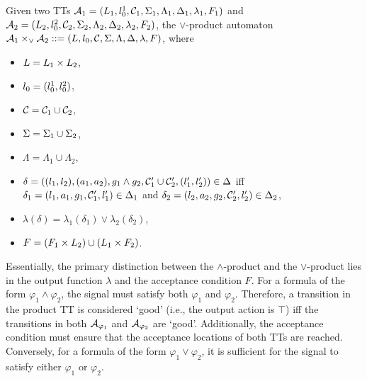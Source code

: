         \begin{definition}
            Given two TTs $\mathcal{A}_1=(L_1,l_0^1,\mathcal{C}_1,\Sigma_1,\Lambda_1,\Delta_1,\allowbreak\lambda_1,F_1)$ and $\mathcal{A}_2=(L_2,l_0^2,\mathcal{C}_2,\Sigma_2,\Lambda_2,\Delta_2,\lambda_2,F_2)$, the $\lor$-product automaton $\mathcal{A}_1\times_{\lor}\mathcal{A}_2\mathrel{::=} (L,l_0,\mathcal{C},\Sigma,\Lambda,\Delta,\lambda,F)$, where
            \begin{itemize}
                \item $L = L_1 \times L_2$,
                \item $l_0 = (l_0^1,l_0^2)$,
                \item $\mathcal{C} = \mathcal{C}_1 \cup \mathcal{C}_2$,
                \item $\Sigma = \Sigma_1 \cup \Sigma_2$,
                \item $\Lambda = \Lambda_1 \cup \Lambda_2$,
                \item $\delta = \left((l_1,l_2),(a_1,a_2),g_1 \land g_2,\mathcal{C}_1'\cup\mathcal{C}_2',(l_1',l_2')\right) \in \Delta$ iff \\ 
                $\delta_1 = (l_1,a_1,g_1,\mathcal{C}_1',l_1')\in \Delta_1$ and $\delta_2 =(l_2,a_2,g_2,\mathcal{C}_2',l_2')\in \Delta_2$,
                \item $\lambda(\delta) = \lambda_1(\delta_1)\lor\lambda_2(\delta_2) $,
                \item $F = (F_1\times L_2)\cup(L_1\times F_2)$.
            \end{itemize}
        \end{definition}
        
        Essentially, the primary distinction between the $\land$-product and the $\lor$-product lies in the output function $\lambda$ and the acceptance condition $F$. For a formula of the form $\varphi_1 \land \varphi_2$, the signal must satisfy both $\varphi_1$ and $\varphi_2$. Therefore, a transition in the product TT is considered `good' (i.e., the output action is $\top$) iff the transitions in both $\mathcal{A}_{\varphi_1}$ and $\mathcal{A}_{\varphi_2}$ are `good'. Additionally, the acceptance condition must ensure that the acceptance locations of both TTs are reached. Conversely, for a formula of the form $\varphi_1 \lor \varphi_2$, it is sufficient for the signal to satisfy either $\varphi_1$ or $\varphi_2$.
        

